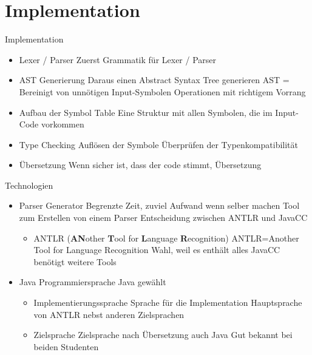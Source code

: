 \section{Implementation}
\begin{frame}[t]{Implementation}

	\begin{itemize}[<+->]
		\item Lexer / Parser
		 {Zuerst Grammatik für Lexer / Parser}
		\item AST Generierung
		 {Daraus einen Abstract Syntax Tree generieren}
		 {AST = Bereinigt von unnötigen Input-Symbolen}
		 {Operationen mit richtigem Vorrang}
		\item Aufbau der Symbol Table
		 {Eine Struktur mit allen Symbolen, die im Input-Code vorkommen}
		\item Type Checking
		 {Auflösen der Symbole}
		 {Überprüfen der Typenkompatibilität}
		\item Übersetzung
		 {Wenn sicher ist, dass der code stimmt, Übersetzung}
	\end{itemize}

\end{frame}

\begin{frame}[t]{Technologien}
	\begin{itemize}[<+->]
		\item Parser Generator
		 {Begrenzte Zeit, zuviel Aufwand wenn selber machen}
		 {Tool zum Erstellen von einem Parser}
		 {Entscheidung zwischen ANTLR und JavaCC}
		\begin{itemize}
			\item ANTLR (\textbf{AN}other \textbf{T}ool for \textbf{L}anguage \textbf{R}ecognition)
			 {ANTLR=Another Tool for Language Recognition}
			 {Wahl, weil es enthält alles}
			 {JavaCC benötigt weitere Tools}
		\end{itemize}

		\item Java 
		 {Programmiersprache Java gewählt}
		\begin{itemize}
			\item Implementierungssprache 
			 {Sprache für die Implementation}
			 {Hauptsprache von ANTLR nebst anderen Zielsprachen}
			\item Zielsprache
			 {Zielsprache nach Übersetzung auch Java}
			 {Gut bekannt bei beiden Studenten}
		\end{itemize}
	\end{itemize}
\end{frame}


